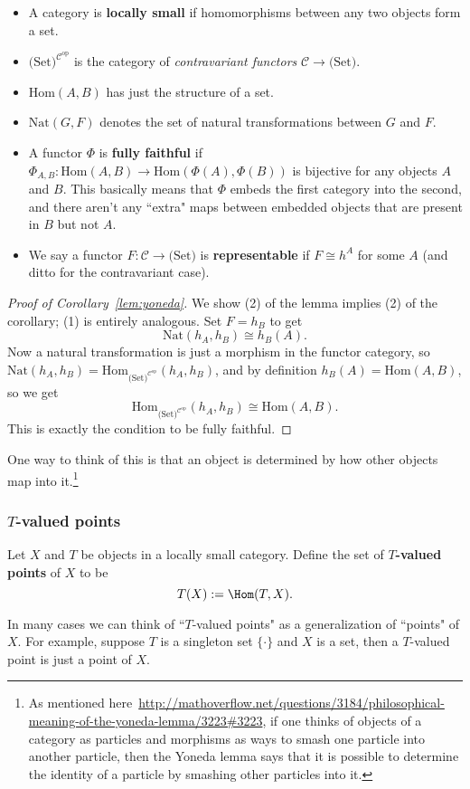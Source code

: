 \begin{rem}
\begin{itemize}
\item
A category is \textbf{locally small} if homomorphisms between any two objects form a set.
\item 
$ \text{(Set)}^{\mathcal C^{\text{op}}}$ is the category of \emph{contravariant functors} $ \mathcal C\to \text{(Set)}$.
\item
$ \text{Hom}(A,B)$ has just the structure of a set.
\item
$ \text{Nat}(G,F)$ denotes the set of natural transformations between $ G$ and $ F$.
\item
A functor $ \Phi$ is \textbf{fully faithful} if $ \Phi_{A,B}:\text{Hom}(A,B)\to \text{Hom}(\Phi(A),\Phi(B))$ is bijective for any objects $ A$ and $ B$. This basically means that $ \Phi$ embeds the first category into the second, and there aren't any ``extra" maps between embedded objects that are present in $ B$ but not $ A$.
\item
We say a functor $ F:\mathcal C\to \text{(Set)}$ is \textbf{representable} if $ F\cong h^A$ for some $ A$ (and ditto for the contravariant case).
\end{itemize}
\end{rem}
\begin{proof}[Proof of Corollary~\ref{lem:yoneda}]
We show (2) of the lemma implies (2) of the corollary; (1) is entirely analogous. Set $ F=h_B$ to get
\[\text{Nat}(h_A,h_B)\cong h_B(A).\]
Now a natural transformation is just a morphism in the functor category, so $ \text{Nat}(h_A,h_B)=\text{Hom}_{\text{(Set)}^{\mathcal C^{\text{op}}}}(h_A,h_B)$, and by definition $ h_B(A)=\text{Hom}(A,B)$, so we get
\[\text{Hom}_{\text{(Set)}^{\mathcal C^{\text{op}}}}(h_A,h_B)\cong \text{Hom}(A,B).\]
This is exactly the condition to be fully faithful.
\end{proof}
One way to think of this is that an object is determined by how other objects map into it.\footnote{As mentioned here~\url{http://mathoverflow.net/questions/3184/philosophical-meaning-of-the-yoneda-lemma/3223\#3223}, if one thinks of objects of a category as particles and morphisms as ways to smash one particle into another particle, then the Yoneda lemma says that it is possible to determine the identity of a particle by smashing other particles into it.}
\subsubsection{$T$-valued points}
\begin{df}
Let $X$ and $T$ be objects in a locally small category. Define the set of \textbf{$T$-valued points} of $X$ to be
\[
T(X):=\Hom(T,X).
\]
\end{df}
In many cases we can think of ``$T$-valued points" as a generalization of ``points" of $X$. For example, suppose $T$ is a singleton set $\{\cdot\}$ and $X$ is a set, then a $T$-valued point is just a point of $X$.


